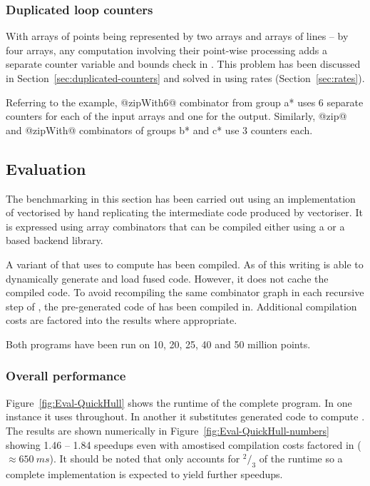 \documentclass[preamble.tex]{subfiles}
\begin{document}
\subsubsection{Duplicated loop counters}

With arrays of points being represented by two arrays and arrays of lines -- by four arrays, any computation involving their point-wise processing adds a separate counter variable and bounds check in \StreamFusion. This problem has been discussed in Section~\ref{sec:duplicated-counters} and solved in \LiveFusion using rates (Section~\ref{sec:rates}).

Referring to the \FilterMax example, @zipWith6@ combinator from group \*a* uses 6 separate counters for each of the input arrays and one for the output. Similarly, @zip@ and @zipWith@ combinators of groups \*b* and \*c* use 3 counters each.



\subsection{Evaluation}

The benchmarking in this section has been carried out using an implementation of \QuickHull vectorised by hand replicating the intermediate  code produced by \DPH vectoriser. It is expressed using array combinators that can be compiled either using a \StreamFusion or a \LiveFusion based backend library.

A variant of \QuickHull that uses \LiveFusion to compute \FilterMax has been compiled. As of this writing \LiveFusion is able to dynamically generate and load fused code. However, it does not cache the compiled code. To avoid recompiling the same combinator graph in each recursive step of \QuickHull, the pre-generated code of \FilterMax has been compiled in. Additional compilation costs are factored into the results where appropriate.

Both programs have been run on 10, 20, 25, 40 and 50 million points.


\subsubsection{Overall performance}

Figure~\ref{fig:Eval-QuickHull} shows the runtime of the complete \QuickHull program. In one instance it uses \StreamFusion throughout. In another it substitutes \LiveFusion generated code to compute \FilterMax. The results are shown numerically in Figure~\ref{fig:Eval-QuickHull-numbers} showing 1.46 -- 1.84 speedups even with amostised compilation costs factored in ($\approx 650\ ms$). It should be noted that \FilterMax only accounts for $^2/_3$ of the runtime so a complete \LiveFusion implementation is expected to yield further speedups.
\end{document}
